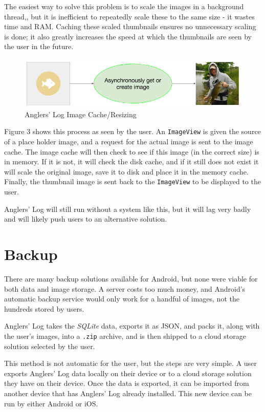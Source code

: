 \documentclass{article}
\begin{document}
	The easiest way to solve this problem is to scale the images in a background thread,, but it is inefficient to repeatedly scale these to the same size - it wastes time and RAM.  Caching these scaled thumbnails ensures no unnecessary scaling is done; it also greatly increases the speed at which the thumbnails are seen by the user in the future.
	
	\begin{figure}[h]
		\caption{Anglers' Log Image Cache/Resizing}
		\includegraphics[width=\textwidth]{imagecache}
	\end{figure}

	Figure 3 shows this process as seen by the user.  An \texttt{ImageView} is given the source of a place holder image, and a request for the actual image is sent to the image cache.  The image cache will then check to see if this image (in the correct size) is in memory.  If it is not, it will check the disk cache, and if it still does not exist it will scale the original image, save it to disk and place it in the memory cache.  Finally, the thumbnail image is sent back to the \texttt{ImageView} to be displayed to the user.

	Anglers' Log will still run without a system like this, but it will lag very badly and will likely push users to an alternative solution.
	

	\section{Backup}

	There are many backup solutions available for Android, but none were viable for both data and image storage.	A server costs too much money, and Android's automatic backup service would only work for a handful of images, not the hundreds stored by users.
		
	Anglers' Log takes the \textit{SQLite} data, exports it as JSON, and packs it, along with the user's images, into a \texttt{.zip} archive, and is then shipped to a cloud storage solution selected by the user.

	This method is not automatic for the user, but the steps are very simple.  A user exports Anglers' Log data locally on their device or to a cloud storage solution they have on their device.  Once the data is exported, it can be imported from another device that has Anglers' Log already installed.  This new device can be run by either Android or iOS.
\end{document}
